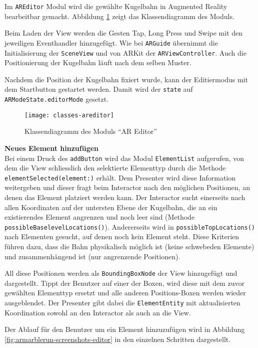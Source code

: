 Im \texttt{AREditor} Modul wird die gewählte Kugelbahn in Augmented Reality bearbeitbar gemacht.
Abbildung \ref{fig:classes-areditor} zeigt das Klassendiagramm des Moduls.

Beim Laden der View werden die Gesten Tap, Long Press und Swipe mit den jeweiligen Eventhandler hinzugefügt.
Wie bei \texttt{ARGuide} übernimmt die Initialisierung der \texttt{SceneView} und von ARKit der \texttt{ARViewController}.
Auch die Positionierung der Kugelbahn läuft nach dem selben Muster.

Nachdem die Position der Kugelbahn fixiert wurde, kann der Editiermodus mit dem Startbutton gestartet werden.
Damit wird der \texttt{state} auf \texttt{ARModeState.editorMode} gesetzt.

\begin{figure}[htb!]
	\centering
	\texttt{[image: classes-areditor]}%
	\caption{Klassendiagramm des Moduls "`AR Editor"'}%
	\label{fig:classes-areditor}%
\end{figure}

\textbf{Neues Element hinzufügen} \\
Bei einem Druck des \texttt{addButton} wird das Modul \texttt{ElementList} aufgerufen, von dem die View schliesslich den selektierte Elementtyp durch die Methode \texttt{elementSelected(element:)} erhält.
Dem Presenter wird diese Information weitergeben und dieser fragt beim Interactor nach den möglichen Positionen, an denen das Element platziert werden kann.
Der Interactor sucht einerseits nach allen Koordinaten auf der untersten Ebene der Kugelbahn, die an ein existierendes Element angrenzen und noch leer sind (Methode \texttt{possibleBaselevelLocations()}).
Andererseits wird in \texttt{possibleTopLocations()} nach Elementen gesucht, auf denen noch kein Element steht.
Diese Kriterien führen dazu, dass die Bahn physikalisch möglich ist (keine schwebeden Elemente) und zusammenhängend ist (nur angrenzende Positionen).

All diese Positionen werden als \texttt{BoundingBoxNode} der View hinzugefügt und dargestellt.
Tippt der Benutzer auf einer der Boxen, wird diese mit dem zuvor gewählten Elementtyp ersetzt und alle anderen Positions-Boxen werden wieder ausgeblendet.
Der Presenter gibt dabei die \texttt{ElementEntity} mit aktualisierten Koordination sowohl an den Interactor als auch an die View.

Der Ablauf für den Benutzer um ein Element hinzuzufügen wird in Abbildung \ref{fig:armarblerun-screenshots-editor} in den einzelnen Schritten dargestellt.

